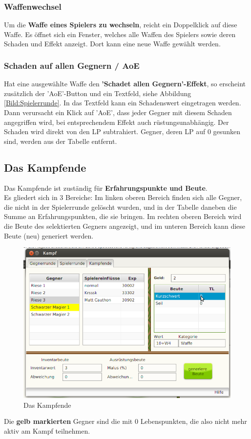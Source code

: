 \documentclass[11pt, a4paper, german]{article}
\begin{document}
\subsubsection{Waffenwechsel}
Um die \textbf{Waffe eines Spielers zu wechseln}, reicht ein Doppelklick auf diese Waffe. Es öffnet sich ein Fenster, welches alle Waffen des Spielers sowie deren Schaden und Effekt anzeigt. Dort kann eine neue Waffe gewählt werden.

\subsubsection{Schaden auf allen Gegnern / AoE}\label{Abschnitt:aoe}
Hat eine ausgewählte Waffe den \textbf{'Schadet allen Gegnern'-Effekt}, so erscheint zusätzlich der 'AoE'-Button und ein Textfeld, siehe Abbildung \ref{Bild:Spielerrunde}. In das Textfeld kann ein Schadenswert eingetragen werden. Dann verursacht ein Klick auf 'AoE', dass jeder Gegner mit diesem Schaden angegriffen wird, bei entsprechendem Effekt auch rüstungsunabhängig. Der Schaden wird direkt von den LP subtrahiert. Gegner, deren LP auf 0 gesunken sind, werden aus der Tabelle entfernt.

\subsection{Das Kampfende}\label{Abschnitt:Kampfende}
Das Kampfende ist zuständig für \textbf{Erfahrungspunkte und Beute}.\\
Es gliedert sich in 3 Bereiche: Im linken oberen Bereich finden sich alle Gegner, die nicht in der Spielerrunde gelöscht wurden, und in der Tabelle daneben die Summe an Erfahrungspunkten, die sie bringen. Im rechten oberen Bereich wird die Beute des selektierten Gegners angezeigt, und im unteren Bereich kann diese Beute (neu) generiert werden.\\
\begin{figure}
\centering
\includegraphics[width=\linewidth]{Bilder/Kampfende.png}
\caption{Das Kampfende}
\label{Bild:Kampfende}
\end{figure}
Die \textbf{gelb markierten} Gegner sind die mit 0 Lebenspunkten, die also nicht mehr aktiv am Kampf teilnehmen.\\
\end{document}

